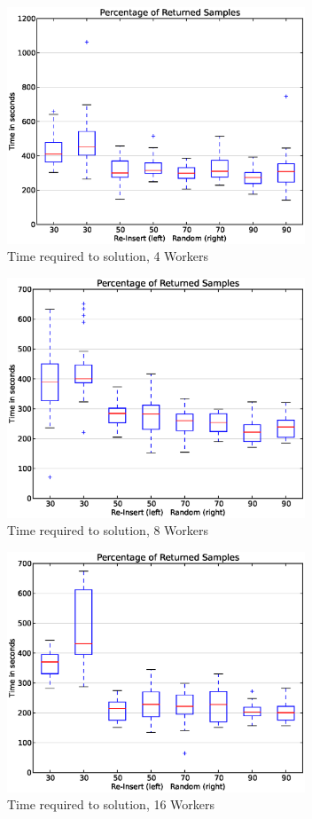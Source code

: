 \documentclass{sig-alternate}
\begin{document}
\begin{figure}[t]
\centering
\includegraphics[width=3.5in]{eps/plot_time_CRS_w4.eps}
\caption{Time required to solution, 4 Workers}
\label{fig:plot_time_ri_w4}
\end{figure}



\begin{figure}[!t]
\centering
\includegraphics[width=3.5in]{eps/plot_time_CRS_w8.eps}
\caption{Time required to solution, 8 Workers}
\label{fig:plot_time_ri_w8}
\end{figure}


\begin{figure}[!t]
\centering
\includegraphics[width=3.5in]{eps/plot_time_CRS_w16.eps}
\caption{Time required to solution, 16 Workers}
\label{fig:plot_time_ri_w16}
\end{figure}
\end{document}
